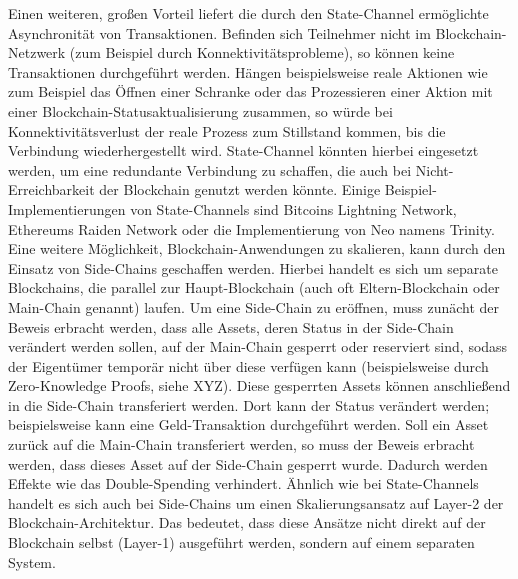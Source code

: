 Einen weiteren, großen Vorteil liefert die durch den State-Channel ermöglichte Asynchronität von Transaktionen. Befinden sich Teilnehmer nicht im Blockchain-Netzwerk (zum Beispiel durch Konnektivitätsprobleme), so können keine Transaktionen durchgeführt werden. Hängen beispielsweise reale Aktionen wie zum Beispiel das Öffnen einer Schranke oder das Prozessieren einer Aktion mit einer Blockchain-Statusaktualisierung zusammen, so würde bei Konnektivitätsverlust der reale Prozess zum Stillstand kommen, bis die Verbindung wiederhergestellt wird. State-Channel könnten hierbei eingesetzt werden, um eine redundante Verbindung zu schaffen, die auch bei Nicht-Erreichbarkeit der Blockchain genutzt werden könnte. Einige Beispiel-Implementierungen von State-Channels sind Bitcoins Lightning Network, Ethereums Raiden Network oder die Implementierung von Neo namens Trinity.\\
Eine weitere Möglichkeit, Blockchain-Anwendungen zu skalieren, kann durch den Einsatz von Side-Chains geschaffen werden. Hierbei handelt es sich um separate Blockchains, die parallel zur Haupt-Blockchain (auch oft Eltern-Blockchain oder Main-Chain genannt) laufen. Um eine Side-Chain zu eröffnen, muss zunächt der Beweis erbracht werden, dass alle Assets, deren Status in der Side-Chain verändert werden sollen, auf der Main-Chain gesperrt oder reserviert sind, sodass der Eigentümer temporär nicht über diese verfügen kann (beispielsweise durch Zero-Knowledge Proofs, siehe XYZ). Diese gesperrten Assets können anschließend in die Side-Chain transferiert werden. Dort kann der Status verändert werden; beispielsweise kann eine Geld-Transaktion durchgeführt werden. Soll ein Asset zurück auf die Main-Chain transferiert werden, so muss der Beweis erbracht werden, dass dieses Asset auf der Side-Chain gesperrt wurde. Dadurch werden Effekte wie das Double-Spending verhindert. Ähnlich wie bei State-Channels handelt es sich auch bei Side-Chains um einen Skalierungsansatz auf Layer-2 der Blockchain-Architektur. Das bedeutet, dass diese Ansätze nicht direkt auf der Blockchain selbst (Layer-1) ausgeführt werden, sondern auf einem separaten System.


